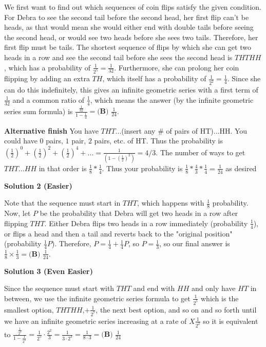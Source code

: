 \begin{enumerate}
We first want to find out which sequences of coin flips satisfy the given condition. For Debra to see the second tail before the second head, her first flip can't be heads, as that would mean she would either end with double tails before seeing the second head, or would see two heads before she sees two tails. Therefore, her first flip must be tails. The shortest sequence of flips by which she can get two heads in a row and see the second tail before she sees the second head is $THTHH$, which has a probability of $\frac{1}{2^5} = \frac{1}{32}$. Furthermore, she can prolong her coin flipping by adding an extra $TH$, which itself has a probability of $\frac{1}{2^2} = \frac{1}{4}$. Since she can do this indefinitely, this gives an infinite geometric series with a first term of $\frac{1}{32}$ and a common ratio of $\frac{1}{4}$, which means the answer (by the infinite geometric series sum formula) is $\frac{\frac{1}{32}}{1-\frac{1}{4}} = \boxed{\textbf{(B) }\frac{1}{24}}$.

 \textbf{Alternative finish} You have $THT$...(insert any \# of pairs of HT)...HH. You could have $0$ pairs, $1$ pair, $2$ pairs, etc. of HT. Thus the probability is $(\frac{1}{2})^0+(\frac{1}{2})^2+(\frac{1}{2})^4+...=\frac{1}{(1-(\frac{1}{2})^2)}=4/3$. The number of ways to get $THT...HH$ in that order is $\frac{1}{8} * \frac{1}{4}$. Thus your probability is $\frac{1}{8} * \frac{4}{3} * \frac{1}{4} = \frac{1}{24}$ as desired

 


 



\textbf{Solution 2 (Easier)}

Note that the sequence must start in $THT$, which happens with $\frac{1}{8}$ probability. Now, let $P$ be the probability that Debra will get two heads in a row after flipping $THT$. Either Debra flips two heads in a row immediately (probability $\frac{1}{4}$), or flips a head and then a tail and reverts back to the "original position" (probability $\frac{1}{4}P$). Therefore, $P=\frac{1}{4}+\frac{1}{4}P$, so $P=\frac{1}{3}$, so our final answer is $\frac{1}{8}\times\frac{1}{3}=\boxed{\textbf{(B) }\frac{1}{24}}$.   

 



\textbf{Solution 3 (Even Easier)}

Since the sequence must start with $THT$ and end with $HH$ and only have $HT$ in between, we use the infinite geometric series formula to get $\frac{1}{2^5}$ which is the smallest option, $THTHH$,$+\frac{1}{2^7}$, the next best option, and so on and so forth until we have an infinite geometric series increasing at a rate of $X\frac{1}{2^2}$ so it is equivalent to $\frac{\frac{1}{2^5}}{1-\frac{1}{2^2}}=\frac{1}{2^5}\cdot\frac{2^2}{3}=\frac{1}{3\cdot2^3}=\frac{1}{8\cdot3}=\boxed{\textbf{(B) }\frac{1}{24}}$




\end{enumerate}
